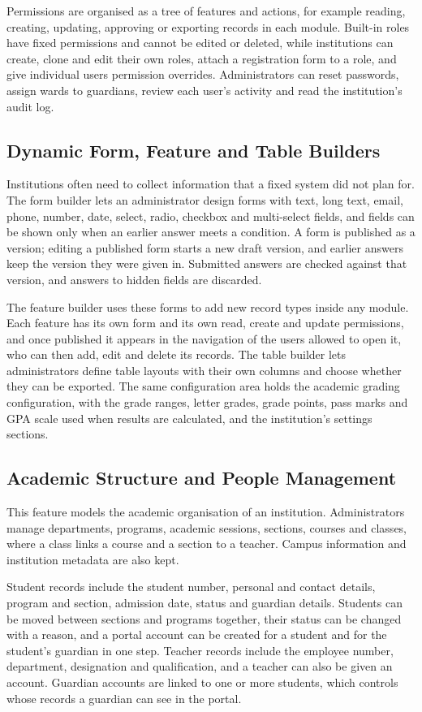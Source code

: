 Permissions are organised as a tree of features and actions, for example reading, creating, updating, approving or exporting records in each module. Built-in roles have fixed permissions and cannot be edited or deleted, while institutions can create, clone and edit their own roles, attach a registration form to a role, and give individual users permission overrides. Administrators can reset passwords, assign wards to guardians, review each user's activity and read the institution's audit log.

\subsection{Dynamic Form, Feature and Table Builders}
Institutions often need to collect information that a fixed system did not plan for. The form builder lets an administrator design forms with text, long text, email, phone, number, date, select, radio, checkbox and multi-select fields, and fields can be shown only when an earlier answer meets a condition. A form is published as a version; editing a published form starts a new draft version, and earlier answers keep the version they were given in. Submitted answers are checked against that version, and answers to hidden fields are discarded.

The feature builder uses these forms to add new record types inside any module. Each feature has its own form and its own read, create and update permissions, and once published it appears in the navigation of the users allowed to open it, who can then add, edit and delete its records. The table builder lets administrators define table layouts with their own columns and choose whether they can be exported. The same configuration area holds the academic grading configuration, with the grade ranges, letter grades, grade points, pass marks and GPA scale used when results are calculated, and the institution's settings sections.

\subsection{Academic Structure and People Management}
This feature models the academic organisation of an institution. Administrators manage departments, programs, academic sessions, sections, courses and classes, where a class links a course and a section to a teacher. Campus information and institution metadata are also kept.

Student records include the student number, personal and contact details, program and section, admission date, status and guardian details. Students can be moved between sections and programs together, their status can be changed with a reason, and a portal account can be created for a student and for the student's guardian in one step. Teacher records include the employee number, department, designation and qualification, and a teacher can also be given an account. Guardian accounts are linked to one or more students, which controls whose records a guardian can see in the portal.

